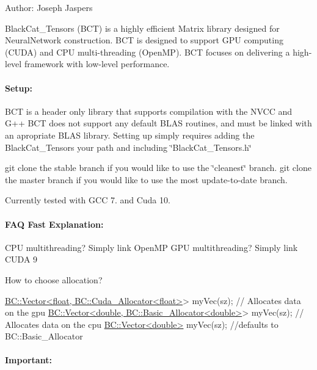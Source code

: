 Author\+: Joseph Jaspers

Black\+Cat\+\_\+\+Tensors (B\+CT) is a highly efficient Matrix library designed for Neural\+Network construction. B\+CT is designed to support G\+PU computing (C\+U\+DA) and C\+PU multi-\/threading (Open\+MP). B\+CT focuses on delivering a high-\/level framework with low-\/level performance.

\paragraph*{Setup\+:}

B\+CT is a header only library that supports compilation with the N\+V\+CC and G++ B\+CT does not support any default B\+L\+AS routines, and must be linked with an apropriate B\+L\+AS library. Setting up simply requires adding the Black\+Cat\+\_\+\+Tensors your path and including \char`\"{}\+Black\+Cat\+\_\+\+Tensors.\+h\char`\"{}

{\ttfamily git clone} the {\ttfamily stable} branch if you would like to use the \char`\"{}cleanest\char`\"{} branch. {\ttfamily git clone} the {\ttfamily master} branch if you would like to use the most update-\/to-\/date branch.

Currently tested with G\+CC 7. and Cuda 10.

\paragraph*{F\+AQ Fast Explanation\+:}

C\+PU multithreading? Simply link Open\+MP G\+PU multithreading? Simply link C\+U\+DA 9

How to choose allocation?


\begin{DoxyCode}
\hyperlink{classBC_1_1tensors_1_1Tensor__Base}{BC::Vector<float, BC::Cuda\_Allocator<float>}> myVec(sz);    \textcolor{comment}{//
      Allocates data on the gpu}
\hyperlink{classBC_1_1tensors_1_1Tensor__Base}{BC::Vector<double, BC::Basic\_Allocator<double>}> myVec(sz); \textcolor{comment}{//
      Allocates data on the cpu}
\hyperlink{classBC_1_1tensors_1_1Tensor__Base}{BC::Vector<double>}  myVec(sz);                             \textcolor{comment}{//defaults to
       BC::Basic\_Allocator}
\end{DoxyCode}


\paragraph*{Important\+:}

